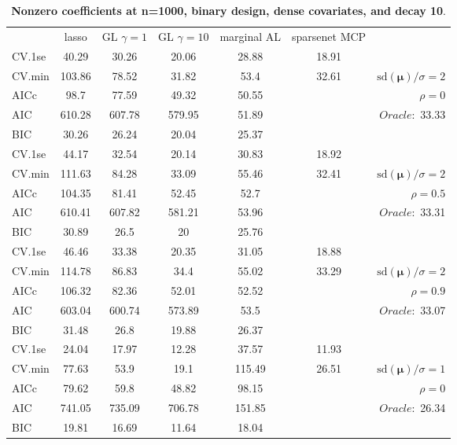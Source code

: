 \begin{table}\vspace{-.5cm}
\caption[l]{ { \bf Nonzero coefficients at n=1000, binary design, 
dense covariates, and  decay  10}.}
\vspace{-.5cm}
\footnotesize{}
\begin{center}
\begin{tabular}{l*{5}{c}|r}
& lasso & GL $\gamma=1$ & GL $\gamma=10$ & marginal AL & sparsenet MCP  & \\
 \cline{1-7}
CV.1se & 40.29 & 30.26 & 20.06 & 28.88 & 18.91 & \\
CV.min & 103.86 & 78.52 & 31.82 & 53.4 & 32.61 &  $\mathrm{sd}(\mathbf{\mu})/\sigma=2$ \\
AICc & 98.7 & 77.59 & 49.32 & 50.55 & & $\rho=0$ \\
AIC & 610.28 & 607.78 & 579.95 & 51.89 & &  \multirow{2}{*}{$Oracle: $ 33.33} \\
BIC & 30.26 & 26.24 & 20.04 & 25.37 & &  \\
 \hline 
CV.1se & 44.17 & 32.54 & 20.14 & 30.83 & 18.92 & \\
CV.min & 111.63 & 84.28 & 33.09 & 55.46 & 32.41 &  $\mathrm{sd}(\mathbf{\mu})/\sigma=2$ \\
AICc & 104.35 & 81.41 & 52.45 & 52.7 & & $\rho=0.5$ \\
AIC & 610.41 & 607.82 & 581.21 & 53.96 & &  \multirow{2}{*}{$Oracle: $ 33.31} \\
BIC & 30.89 & 26.5 & 20 & 25.76 & &  \\
 \hline 
CV.1se & 46.46 & 33.38 & 20.35 & 31.05 & 18.88 & \\
CV.min & 114.78 & 86.83 & 34.4 & 55.02 & 33.29 &  $\mathrm{sd}(\mathbf{\mu})/\sigma=2$ \\
AICc & 106.32 & 82.36 & 52.01 & 52.52 & & $\rho=0.9$ \\
AIC & 603.04 & 600.74 & 573.89 & 53.5 & &  \multirow{2}{*}{$Oracle: $ 33.07} \\
BIC & 31.48 & 26.8 & 19.88 & 26.37 & &  \\
 \hline 
CV.1se & 24.04 & 17.97 & 12.28 & 37.57 & 11.93 & \\
CV.min & 77.63 & 53.9 & 19.1 & 115.49 & 26.51 &  $\mathrm{sd}(\mathbf{\mu})/\sigma=1$ \\
AICc & 79.62 & 59.8 & 48.82 & 98.15 & & $\rho=0$ \\
AIC & 741.05 & 735.09 & 706.78 & 151.85 & &  \multirow{2}{*}{$Oracle: $ 26.34} \\
BIC & 19.81 & 16.69 & 11.64 & 18.04 & &  \\

\end{tabular}
\end{center}
\end{table}
